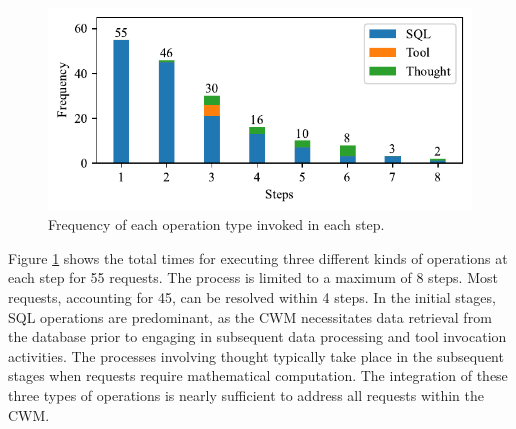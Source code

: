 \documentclass[preprint,12pt]{elsarticle}
\begin{document}
\begin{figure}[t]%
\centering%
\includegraphics[width=0.8\linewidth]{figs/stacked_bar_chart.pdf}
\caption{Frequency of each operation type invoked in each step.}
\label{fig:dist_operation}
\end{figure}
Figure \ref{fig:dist_operation} shows the total times for executing three different kinds of operations at each step for 55 requests.
The process is limited to a maximum of 8 steps. 
Most requests, accounting for 45, can be resolved within 4 steps.
In the initial stages, SQL operations are predominant, as the CWM necessitates data retrieval from the database prior to engaging in subsequent data processing and tool invocation activities. 
The processes involving thought typically take place in the subsequent stages when requests require mathematical computation. 
The integration of these three types of operations is nearly sufficient to address all requests within the CWM.
\end{document}
